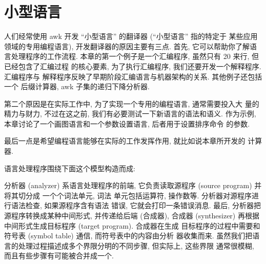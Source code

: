 \chapter{小型语言}
\label{chap:little_languages}

人们经常使用 awk 开发 ``小型语言'' 的翻译器 (``小型语言'' 指的特定于
某些应用领域的专用编程语言), 
开发翻译器的原因主要有三点. 首先, 它可以帮助你了解语言处理程序的工作流程.
本章的第一个例子是一个汇编程序, 虽然只有 20 来行, 但已经包含了汇编过程
的核心要素, 为了执行汇编程序, 我们还要开发一个解释程序. 汇编程序与
解释程序反映了早期阶段汇编语言与机器架构的关系. 其他例子还包括一个
后缀计算器, awk 子集的递归下降分析器.

第二个原因是在实际工作中, 为了实现一个专用的编程语言, 通常需要投入大
量的精力与财力, 不过在这之前, 我们有必要测试一下新语言的语法和语义. 
作为示例, 本章讨论了一个画图语言和一个参数设置语言, 后者用于设置排序命令
的参数.

最后一点是希望编程语言能够在实际的工作发挥作用, 就比如说本章所开发的
计算器.

语言处理程序围绕下面这个模型构造而成:
\begin{center}
\end{center}

分析器 (analyzer) 系语言处理程序的前端, 它负责读取源程序 (source program)
并将其切分成 一个个词法单元, 词法
单元包括运算符, 操作数等. 分析器对源程序进行语法检查, 如果源程序含有语法
错误, 它就会打印一条错误消息. 最后, 分析器把源程序转换成某种中间形式,
并传递给后端 (合成器), 合成器 (synthesizer) 再根据中间形式生成目标程序
(target program). 合成器在生成
目标程序的过程中需要和符号表 (symbol table) 通信, 而符号表中的内容由分析
器收集而来.
虽然我们把语言的处理过程描述成多个界限分明的不同步骤, 但实际上, 这些界限
通常很模糊, 而且有些步骤有可能被合并成一个.

